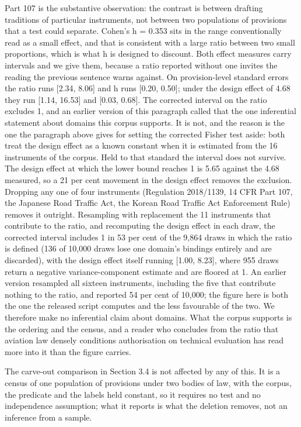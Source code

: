 Part 107 is the substantive observation: the contrast is between drafting traditions of particular instruments, not between two populations of provisions that a test could separate. Cohen's h = 0.353 sits in the range conventionally read as a small effect, and that is consistent with a large ratio between two small proportions, which is what h is designed to discount. Both effect measures carry intervals and we give them, because a ratio reported without one invites the reading the previous sentence warns against. On provision-level standard errors the ratio runs [2.34, 8.06] and h runs [0.20, 0.50]; under the design effect of 4.68 they run [1.14, 16.53] and [0.03, 0.68]. The corrected interval on the ratio excludes 1, and an earlier version of this paragraph called that the one inferential statement about domains this corpus supports. It is not, and the reason is the one the paragraph above gives for setting the corrected Fisher test aside: both treat the design effect as a known constant when it is estimated from the 16 instruments of the corpus. Held to that standard the interval does not survive. The design effect at which the lower bound reaches 1 is 5.65 against the 4.68 measured, so a 21 per cent movement in the design effect removes the exclusion. Dropping any one of four instruments (Regulation 2018/1139, 14 CFR Part 107, the Japanese Road Traffic Act, the Korean Road Traffic Act Enforcement Rule) removes it outright. Resampling with replacement the 11 instruments that contribute to the ratio, and recomputing the design effect in each draw, the corrected interval includes 1 in 53 per cent of the 9,864 draws in which the ratio is defined (136 of 10,000 draws lose one domain's bindings entirely and are discarded), with the design effect itself running [1.00, 8.23], where 955 draws return a negative variance-component estimate and are floored at 1. An earlier version resampled all sixteen instruments, including the five that contribute nothing to the ratio, and reported 54 per cent of 10,000; the figure here is both the one the released script computes and the less favourable of the two. We therefore make no inferential claim about domains. What the corpus supports is the ordering and the census, and a reader who concludes from the ratio that aviation law densely conditions authorisation on technical evaluation has read more into it than the figure carries.

The carve-out comparison in Section 3.4 is not affected by any of this. It is a census of one population of provisions under two bodies of law, with the corpus, the predicate and the labels held constant, so it requires no test and no independence assumption; what it reports is what the deletion removes, not an inference from a sample.

